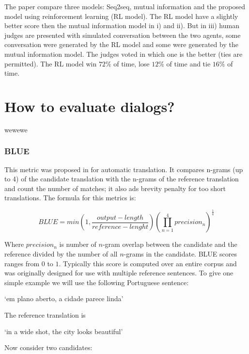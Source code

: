 \par The paper compare three models: Seq2seq, mutual information and the proposed model using reinforcement learning (RL model). The RL model have a slightly better score then the mutual information model in i) and ii). But in iii) human judges are presented with simulated conversation between the two agents, some conversation were generated by the RL model and some were generated by the mutual information model. The judges voted in which one is the better (ties are permitted).  The RL model win $72\%$ of time, lose $12\%$ of time and tie $16\%$ of time.

\section{How to evaluate dialogs?}

wewewe
\subsubsection{BLUE}
This metric was proposed in \cite{Papineni2001} for automatic translation. It compares n-grams (up to 4) of the candidate translation with the n-grams of the reference translation and count the number of matches; it also ads brevity penalty for too short translations. The formula for this metrics is:

\begin{equation}
BLUE = min \left(1, \frac{output-length}{reference-lenght} \right) \left(\prod_{n=1}^{4} precision_{n} \right)^{\frac{1}{4}}
\end{equation}

Where $precision_{n}$ is number of $n$-gram overlap between the candidate and the reference divided by the number of all $n$-grams in the candidate. BLUE scores ranges from $0$ to $1$. Typically this score is computed over an entire corpus and was originally designed for use with multiple reference sentences. To give one simple example we will use the following Portuguese sentence:

\begin{center}
`em plano aberto, a cidade parece linda'
\end{center}

The reference translation is

\begin{center}
`in a wide shot, the city looks beautiful'
\end{center}

Now consider two candidates:

